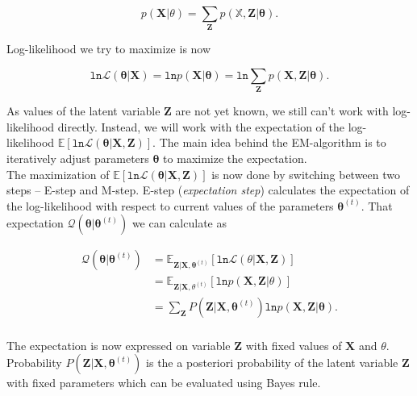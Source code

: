$$ p(\mathbf{X} | \theta) = \sum_{\mathbf{Z}}p(\mathbb{X}, \mathbf{Z} | \boldsymbol \theta). $$

Log-likelihood we try to maximize is now

\begin{equation}
	\mathtt{ln}\mathcal{L}(\boldsymbol \theta | \mathbf{X}) = \mathtt{ln}p(\mathbf{X} | \boldsymbol \theta) = \mathtt{ln}\sum_{\mathbf{Z}}p(\mathbf{X}, \mathbf{Z} | \boldsymbol \theta).
\end{equation}

As values of the latent variable $\mathbf{Z}$ are not yet known, we still can't work with log-likelihood directly. Instead, we will work with the expectation of the log-likelihood $\mathbb{E}[ \mathtt{ln} \mathcal{L}(\boldsymbol \theta | \mathbf{X}, \mathbf{Z}) ]$. The main idea behind the EM-algorithm is to iteratively adjust parameters $\boldsymbol \theta$ to maximize the expectation. \\

The maximization of  $\mathbb{E}[ \mathtt{ln} \mathcal{L}(\boldsymbol \theta | \mathbf{X}, \mathbf{Z}) ]$ is now done by switching between two steps -- E-step and M-step. E-step (\textit{expectation step}) calculates the expectation of the log-likelihood with respect to current values of the parameters  $ \boldsymbol\theta^{(t)}$. That expectation $\mathcal{Q}( \boldsymbol \theta | \boldsymbol \theta^{(t)})$ we can calculate as

\begin{equation} \label{eq1}
\begin{split}
  \mathcal{Q}(\boldsymbol \theta | \boldsymbol \theta^{(t)}) &= \mathbb{E}_{\mathbf{Z} | \mathbf{X}, \boldsymbol \theta^{(t)}}[ \mathtt{ln} \mathcal{L}(\theta | \mathbf{X}, \mathbf{Z}) ] \\
     &= \mathbb{E}_{\mathbf{Z} | \mathbf{X}, \theta^{(t)}}[ \mathtt{ln} p(\mathbf{X}, \mathbf{Z} | \theta) ] \\
      &= \sum_{\mathbf{Z}}P(\mathbf{Z}| \mathbf{X}, \boldsymbol \theta^{(t)})\mathtt{ln} p(\mathbf{X}, \mathbf{Z} | \boldsymbol \theta). \\
\end{split}
\end{equation}

The expectation is now expressed on variable $\mathbf{Z}$ with fixed values of $\mathbf{X}$ and $\theta$. Probability $P(\mathbf{Z}| \mathbf{X}, \boldsymbol \theta^{(t)})$ is the a posteriori  probability of the latent variable $\mathbf{Z}$ with fixed parameters which can be evaluated using Bayes rule. \\

